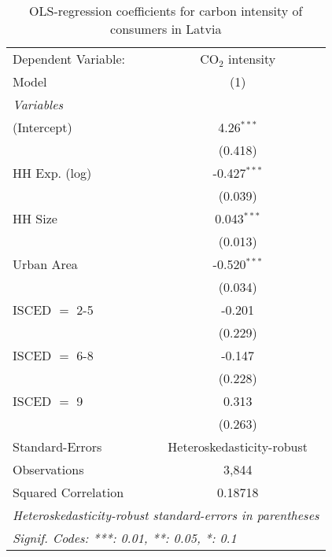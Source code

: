 
\begin{table}[htbp!]
   \centering
   \small
   \begin{adjustbox}{width = 1\textwidth, max height = 0.95\textheight, center}
      \begin{threeparttable}[b]
         \caption{\label{tab:OLS_1_LVA} OLS-regression coefficients for carbon intensity of consumers in Latvia}
         \begin{tabular}{lc}
            \tabularnewline \midrule \midrule
            Dependent Variable: & CO$_{2}$ intensity\\  
            Model               & (1)\\  
            \midrule
            \emph{Variables}\\
            (Intercept)         & 4.26$^{***}$\\   
                                & (0.418)\\   
            HH Exp. (log)       & -0.427$^{***}$\\   
                                & (0.039)\\   
            HH Size             & 0.043$^{***}$\\   
                                & (0.013)\\   
            Urban Area          & -0.520$^{***}$\\   
                                & (0.034)\\   
            ISCED $=$ 2-5       & -0.201\\   
                                & (0.229)\\   
            ISCED $=$ 6-8       & -0.147\\   
                                & (0.228)\\   
            ISCED $=$ 9         & 0.313\\   
                                & (0.263)\\   
            \midrule 
            Standard-Errors     & Heteroskedasticity-robust \\   
            Observations        & 3,844\\  
            Squared Correlation & 0.18718\\  
            \midrule \midrule
            \multicolumn{2}{l}{\emph{Heteroskedasticity-robust standard-errors in parentheses}}\\
            \multicolumn{2}{l}{\emph{Signif. Codes: ***: 0.01, **: 0.05, *: 0.1}}\\
         \end{tabular}
         

\end{threeparttable}
\end{adjustbox}
\end{table}
